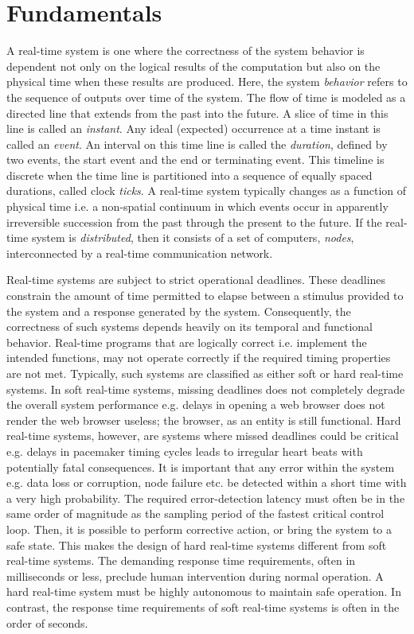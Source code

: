 \chapter{Fundamentals}
\label{chapter:fundamentals}

A real-time system \cite{liu2000real} is one where the correctness of the system behavior is dependent not only on the logical results of the computation but also on the physical time when these results are produced. Here, the system \emph{behavior} refers to the sequence of outputs over time of the system. The flow of time is modeled as a directed line that extends from the past into the future. A slice of time in this line is called an \emph{instant}. Any ideal (expected) occurrence at a time instant is called an \emph{event}. An interval on this time line is called the \emph{duration}, defined by two events, the start event and the end or terminating event. This timeline is discrete when the time line is partitioned into a sequence of equally spaced durations, called clock \emph{ticks}. A real-time system typically changes as a function of physical time i.e. a non-spatial continuum in which events occur in apparently irreversible succession from the past through the present to the future. If the real-time system is \emph{distributed}, then it consists of a set of computers, \emph{nodes}, interconnected by a real-time communication network.

Real-time systems are subject to strict operational deadlines. These deadlines constrain the amount of time permitted to elapse between a stimulus provided to the system and a response generated by the system. Consequently, the correctness of such systems depends heavily on its temporal and functional behavior. Real-time programs that are logically correct i.e. implement the intended functions, may not operate correctly if the required timing properties are not met. Typically, such systems are classified as either soft or hard real-time systems. In soft real-time systems, missing deadlines does not completely degrade the overall system performance e.g. delays in opening a web browser does not render the web browser useless; the browser, as an entity is still functional. Hard real-time systems, however, are systems where missed deadlines could be critical e.g. delays in pacemaker timing cycles leads to irregular heart beats with potentially fatal consequences. It is important that any error within the system e.g. data loss or corruption, node failure etc. be detected within a short time with a very high probability. The required error-detection latency must often be in the same order of magnitude as the sampling period of the fastest critical control loop. Then, it is possible to perform corrective action, or bring the system to a safe state. This makes the design of hard real-time systems different from soft real-time systems. The demanding response time requirements, often in milliseconds or less, preclude human intervention during normal operation. A hard real-time system must be highly autonomous to maintain safe operation. In contrast, the response time requirements of soft real-time systems is often in the order of seconds. 

